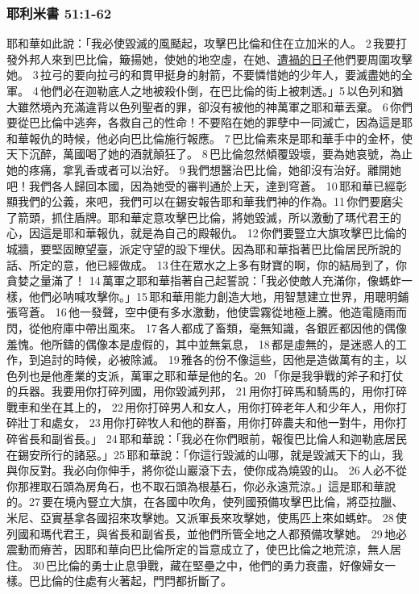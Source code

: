 \subsubsection{耶利米書 51:1-62}
耶和華如此說：「我必使毀滅的風颳起，攻擊巴比倫和住在立加米的人。 2 我要打發外邦人來到巴比倫，簸揚她，使她的地空虛，在她、\underline{遭禍的日子}他們要周圍攻擊她。 3 拉弓的要向拉弓的和貫甲挺身的射箭，不要憐惜她的少年人，要滅盡她的全軍。 4 他們必在迦勒底人之地被殺仆倒，在巴比倫的街上被刺透。」5 以色列和猶大雖然境內充滿違背以色列聖者的罪，卻沒有被他的神萬軍之耶和華丟棄。 6 你們要從巴比倫中逃奔，各救自己的性命！不要陷在她的罪孽中一同滅亡，因為這是耶和華報仇的時候，他必向巴比倫施行報應。 7 巴比倫素來是耶和華手中的金杯，使天下沉醉，萬國喝了她的酒就顛狂了。 8 巴比倫忽然傾覆毀壞，要為她哀號，為止她的疼痛，拿乳香或者可以治好。 9 我們想醫治巴比倫，她卻沒有治好。離開她吧！我們各人歸回本國，因為她受的審判通於上天，達到穹蒼。 10 耶和華已經彰顯我們的公義，來吧，我們可以在錫安報告耶和華我們神的作為。11 你們要磨尖了箭頭，抓住盾牌。耶和華定意攻擊巴比倫，將她毀滅，所以激動了瑪代君王的心，因這是耶和華報仇，就是為自己的殿報仇。 12 你們要豎立大旗攻擊巴比倫的城牆，要堅固瞭望臺，派定守望的設下埋伏。因為耶和華指著巴比倫居民所說的話、所定的意，他已經做成。 13 住在眾水之上多有財寶的啊，你的結局到了，你貪婪之量滿了！ 14 萬軍之耶和華指著自己起誓說：「我必使敵人充滿你，像螞蚱一樣，他們必呐喊攻擊你。」15 耶和華用能力創造大地，用智慧建立世界，用聰明鋪張穹蒼。 16 他一發聲，空中便有多水激動，他使雲霧從地極上騰。他造電隨雨而閃，從他府庫中帶出風來。 17 各人都成了畜類，毫無知識，各銀匠都因他的偶像羞愧。他所鑄的偶像本是虛假的，其中並無氣息， 18 都是虛無的，是迷惑人的工作，到追討的時候，必被除滅。 19 雅各的份不像這些，因他是造做萬有的主，以色列也是他產業的支派，萬軍之耶和華是他的名。20 「你是我爭戰的斧子和打仗的兵器。我要用你打碎列國，用你毀滅列邦， 21 用你打碎馬和騎馬的，用你打碎戰車和坐在其上的， 22 用你打碎男人和女人，用你打碎老年人和少年人，用你打碎壯丁和處女， 23 用你打碎牧人和他的群畜，用你打碎農夫和他一對牛，用你打碎省長和副省長。」 24 耶和華說：「我必在你們眼前，報復巴比倫人和迦勒底居民在錫安所行的諸惡。」25 耶和華說：「你這行毀滅的山哪，就是毀滅天下的山，我與你反對。我必向你伸手，將你從山巖滾下去，使你成為燒毀的山。 26 人必不從你那裡取石頭為房角石，也不取石頭為根基石，你必永遠荒涼。」這是耶和華說的。27 要在境內豎立大旗，在各國中吹角，使列國預備攻擊巴比倫，將亞拉臘、米尼、亞實基拿各國招來攻擊她。又派軍長來攻擊她，使馬匹上來如螞蚱。 28 使列國和瑪代君王，與省長和副省長，並他們所管全地之人都預備攻擊她。 29 地必震動而瘠苦，因耶和華向巴比倫所定的旨意成立了，使巴比倫之地荒涼，無人居住。 30 巴比倫的勇士止息爭戰，藏在堅壘之中，他們的勇力衰盡，好像婦女一樣。巴比倫的住處有火著起，門閂都折斷了。 